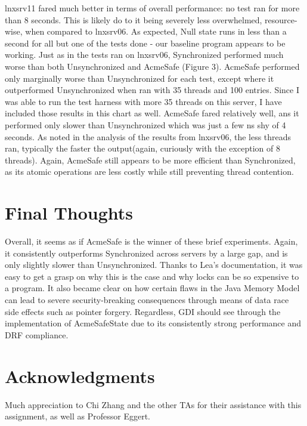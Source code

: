 lnxsrv11 fared much better in terms of overall performance: no test ran for more than 8 seconds. This is likely do to it being severely less overwhelmed, resource-wise, when compared to lnxsrv06. As expected, Null state runs in less than a second for all but one of the tests done - our baseline program appears to be working. Just as in the tests ran on lnxsrv06, Synchronized performed much worse than both Unsynchronized and AcmeSafe (Figure 3). AcmeSafe performed only marginally worse than Unsynchronized for each test, except where it outperformed Unsynchronized when ran with 35 threads and 100 entries. Since I was able to run the test harness with more 35 threads on this server, I have included those results in this chart as well. AcmeSafe fared relatively well, ans it performed only slower than Unsynchronized which was just a few ns shy of 4 seconds. As noted in the analysis of the results from lnxsrv06, the less threads ran, typically the faster the output(again, curiously with the exception of 8 threads). Again, AcmeSafe still appears to be more efficient than Synchronized, as its atomic operations are less costly while still preventing thread contention. 

\section{Final Thoughts}
Overall, it seems as if AcmeSafe is the winner of these brief experiments. Again, it consistently outperforms Synchronized across servers by a large gap, and is only slightly slower than Unsynchronized. Thanks to Lea's documentation, it was easy to get a grasp on why this is the case and why locks can be so expensive to a program. It also became clear on how certain flaws in the Java Memory Model can lead to severe security-breaking consequences through means of data race side effects such as pointer forgery. Regardless, GDI should see through the implementation of AcmeSafeState due to its consistently strong performance and DRF compliance. 


\section*{Acknowledgments}

Much appreciation to Chi Zhang and the other TAs for their assistance with this assignment, as well as Professor Eggert.

